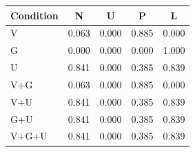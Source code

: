 \begin{tabular}{lcccc}
\toprule
Condition & N & U & P & L \\
\midrule
V & 0.063 & 0.000 & 0.885 & 0.000 \\
G & 0.000 & 0.000 & 0.000 & 1.000 \\
U & 0.841 & 0.000 & 0.385 & 0.839 \\
V+G & 0.063 & 0.000 & 0.885 & 0.000 \\
V+U & 0.841 & 0.000 & 0.385 & 0.839 \\
G+U & 0.841 & 0.000 & 0.385 & 0.839 \\
V+G+U & 0.841 & 0.000 & 0.385 & 0.839 \\
\bottomrule
\end{tabular}